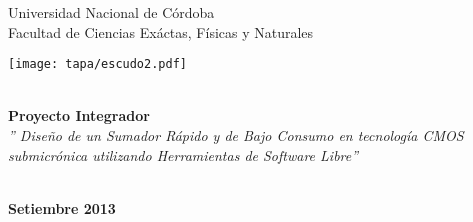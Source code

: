 \begin{titlepage}
\pagestyle{empty}       

\begin{center}
	\Huge{Universidad Nacional de Córdoba\\}
	\Large {Facultad de Ciencias Exáctas, Físicas y Naturales}\\

\vspace{1cm}

\texttt{[image: tapa/escudo2.pdf]}


\vspace{1cm}


	\Huge \textbf{\\[2ex]Proyecto Integrador}
	\Large \textsl{\\[2ex] '' Diseño de un Sumador Rápido y de Bajo Consumo en tecnología CMOS submicrónica utilizando Herramientas de Software Libre''}

	\begin{normalsize}
	\end{normalsize}
	\begin{large}	
		\\ \textbf{Setiembre 2013}
	\end{large}

\end{center}

\vspace{0.5cm}

\begin{center}



\end{center}

\hfuzz=50pt
\end{titlepage}
